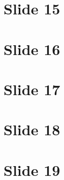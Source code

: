 \documentclass{article}
\begin{document}
\section*{Slide 15}

\section*{Slide 16}

\section*{Slide 17}

\section*{Slide 18}

\section*{Slide 19}
\end{document}
